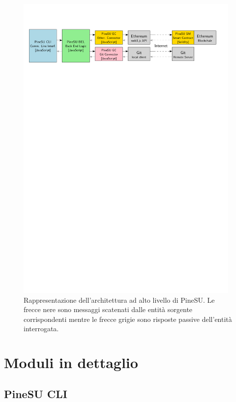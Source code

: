 \begin{figure}[H]
    \centering
    \includegraphics[width=0.98\textwidth]{Figures/PineSU-architecture}
    \caption{\small{
    Rappresentazione dell’architettura ad alto livello di PineSU. 
    Le frecce nere sono messaggi scatenati dalle entità sorgente corrispondenti
    mentre le frecce grigie sono risposte passive dell’entità interrogata.
    } %
    } %
    \label{fi:arch}
\end{figure}

\section{Moduli in dettaglio}
\subsection{PineSU CLI}

